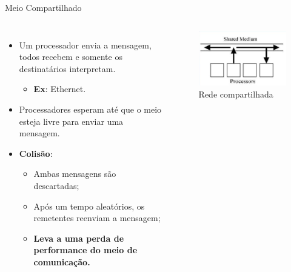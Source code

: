 \begin{frame}{Meio Compartilhado}
    \begin{columns}
        \fontsize{10pt}{7.2}\selectfont
        \begin{itemize}
            \item Um processador envia a mensagem, todos recebem e somente os destinatários interpretam.
            \medskip
            \begin{itemize}
                \item \textbf{Ex}: Ethernet.
            \end{itemize}
            \bigskip
            \item Processadores esperam até que o meio esteja livre para enviar uma mensagem.
            \bigskip
            \item \textbf{Colisão}:
            \medskip
            \begin{itemize}
                \item Ambas mensagens são descartadas;
                \medskip
                \item Após um tempo aleatórios, os remetentes reenviam a mensagem;
                \medskip
                \item \textbf{{\color{bostonuniversityred}Leva a uma perda de performance do meio de comunicação.}}
            \end{itemize}
        \end{itemize}
        \fontsize{10pt}{7.2}\selectfont
        \begin{figure}[H]
            \centering
            \includegraphics[width=1\linewidth]{img/redes_de_interconexao/shared}
            \caption{Rede compartilhada}
            \label{fig:shared}
        \end{figure}
    \end{columns}
\end{frame}

